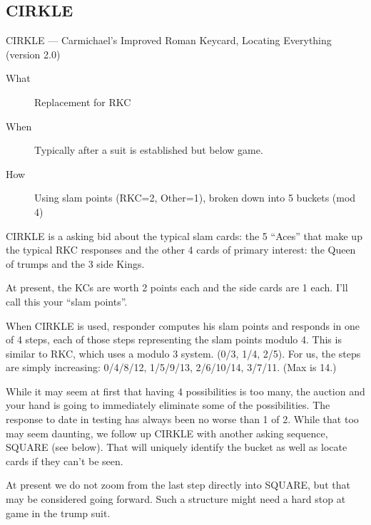 \documentclass[tom-ari]{subfile}
\begin{document}
\subsection{CIRKLE}

CIRKLE --- Carmichael's Improved Roman Keycard, Locating Everything (version 2.0)
 
\normalsize


\begin{description}
	\item[What] Replacement for RKC
	\item[When] Typically after a suit is established but below game.
	\item[How] Using slam points (RKC=2, Other=1), broken down into 5 buckets (mod 4) 
\end{description}

CIRKLE is a asking bid about the typical slam cards:  the 5 ``Aces'' that make up the typical RKC responses and the other 4 cards of primary interest:  the Queen of trumps and the 3 side Kings.

At present, the KCs are worth 2 points each and the side cards are 1 each.  I'll call this your ``slam points''.

When CIRKLE is used, responder computes his slam points and responds in one of 4 steps, each of those steps representing the slam points modulo 4. This is similar to RKC, which uses a modulo 3 system.  (0/3, 1/4, 2/5).  For us, the steps are simply increasing:  0/4/8/12, 1/5/9/13, 2/6/10/14, 3/7/11. (Max is 14.)

While it may seem at first that having 4 possibilities is too many, the auction and your hand is going to immediately eliminate some of the possibilities.  The response to date in testing has always been no worse than 1 of 2.  While that too may seem daunting, we follow up CIRKLE with another asking sequence, SQUARE (see below).  That will uniquely identify the bucket as well as locate cards if they can't be seen.

At present we do not zoom from the last step directly into SQUARE, but that may be considered going forward. Such a structure might need a hard stop at game in the trump suit.
\end{document}
